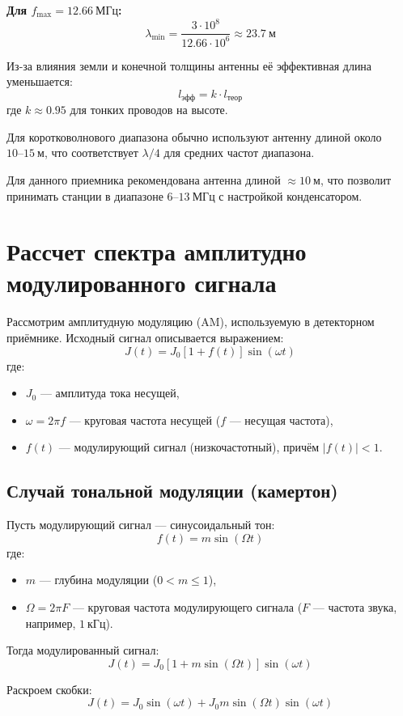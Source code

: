 \documentclass[a4paper]{article}
\begin{document}
\textbf{Для $f_{\max} = 12.66~\text{МГц}$:}
\[
\lambda_{\min} = \frac{3 \cdot 10^{8}}{12.66 \cdot 10^{6}} \approx 23.7~\text{м}
\]

Из-за влияния земли и конечной толщины антенны её эффективная длина уменьшается:
\[
l_{\text{эфф}} = k \cdot l_{\text{теор}}
\]
где $k \approx 0.95$ для тонких проводов на высоте.

Для коротковолнового диапазона обычно используют антенну длиной около $10\text{--}15~\text{м}$, что соответствует $\lambda/4$ для средних частот диапазона.

Для данного приемника рекомендована антенна длиной $\approx 10~\text{м}$, что позволит принимать станции в диапазоне $6\text{--}13~\text{МГц}$ с настройкой конденсатором.

\section{Рассчет спектра амплитудно модулированного сигнала}

Рассмотрим амплитудную модуляцию (AM), используемую в детекторном приёмнике. Исходный сигнал описывается выражением:
\[
J(t) = J_0 \left[1 + f(t)\right] \sin(\omega t)
\]
где:
\begin{itemize}
    \item $J_0$ — амплитуда тока несущей,
    \item $\omega = 2\pi f$ — круговая частота несущей ($f$ — несущая частота),
    \item $f(t)$ — модулирующий сигнал (низкочастотный), причём $|f(t)| < 1$.
\end{itemize}

\subsection{Случай тональной модуляции (камертон)}

Пусть модулирующий сигнал — синусоидальный тон:
\[
f(t) = m \sin(\Omega t)
\]
где:
\begin{itemize}
    \item $m$ — глубина модуляции ($0 < m \leq 1$),
    \item $\Omega = 2\pi F$ — круговая частота модулирующего сигнала ($F$ — частота звука, например, $1~\text{кГц}$).
\end{itemize}

Тогда модулированный сигнал:
\[
J(t) = J_0 \left[1 + m \sin(\Omega t)\right] \sin(\omega t)
\]

Раскроем скобки:
\[
J(t) = J_0 \sin(\omega t) + J_0 m \sin(\Omega t) \sin(\omega t)
\]
\end{document}
